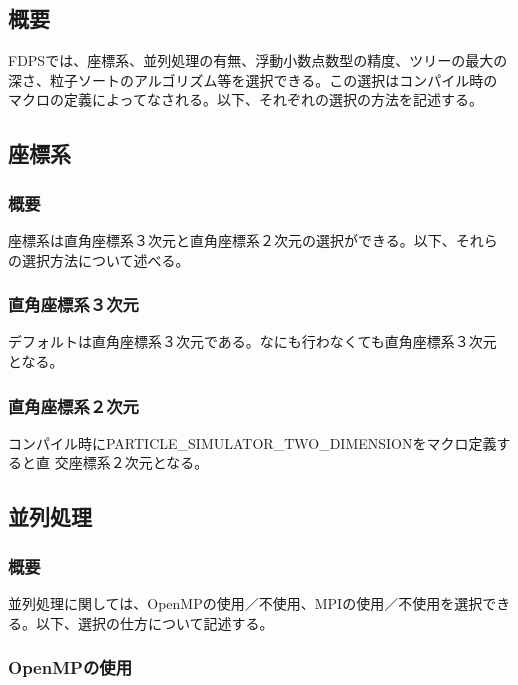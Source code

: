\subsection{概要}

FDPSでは、座標系、並列処理の有無、浮動小数点数型の精度、ツリーの最大の
深さ、粒子ソートのアルゴリズム等を選択できる。この選択はコンパイル時の
マクロの定義によってなされる。以下、それぞれの選択の方法を記述する。

\subsection{座標系}
\label{sec:compile_coordinate}

\subsubsection{概要}

座標系は直角座標系３次元と直角座標系２次元の選択ができる。以下、それら
の選択方法について述べる。

\subsubsection{直角座標系３次元}

デフォルトは直角座標系３次元である。なにも行わなくても直角座標系３次元
となる。

\subsubsection{直角座標系２次元}

コンパイル時にPARTICLE\_SIMULATOR\_TWO\_DIMENSIONをマクロ定義すると直
交座標系２次元となる。

\subsection{並列処理}

\subsubsection{概要}

並列処理に関しては、OpenMPの使用／不使用、MPIの使用／不使用を選択でき
る。以下、選択の仕方について記述する。

\subsubsection{OpenMPの使用}


